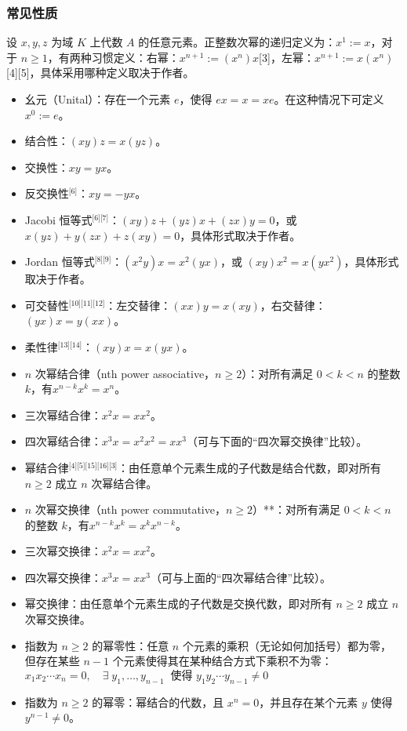\subsubsection{常见性质}
设 $x, y, z$ 为域 $K$ 上代数 $A$ 的任意元素。正整数次幂的递归定义为：$x^1 := x$，对于 $n \geq 1$，有两种习惯定义：右幂：$x^{n+1} := (x^n)x$[3]，左幂：$x^{n+1} := x(x^n)$[4][5]，具体采用哪种定义取决于作者。
\begin{itemize}
\item 幺元（Unital）：存在一个元素 $e$，使得 $ex = x = xe$。在这种情况下可定义 $x^0 := e$。
\item 结合性：$(xy)z = x(yz)$。
\item 交换性：$xy = yx$。
\item 反交换性\(^\text{[6]}\)：$xy = -yx$。
\item Jacobi 恒等式\(^\text{[6][7]}\)：$(xy)z + (yz)x + (zx)y = 0$，或 $x(yz) + y(zx) + z(xy) = 0$，具体形式取决于作者。
\item Jordan 恒等式\(^\text{[8][9]}\)：$(x^2y)x = x^2(yx)$，或 $(xy)x^2 = x(yx^2)$，具体形式取决于作者。
\item 可交替性\(^\text{[10][11][12]}\)：左交替律：$(xx)y = x(xy)$，右交替律：$(yx)x = y(xx)$。
\item 柔性律\(^\text{[13][14]}\)：$(xy)x = x(yx)$。
\item $n$ 次幂结合律（nth power associative，$n \geq 2$）：对所有满足 $0 < k < n$ 的整数 $k$，有$x^{n-k}x^k = x^n$。
\item 三次幂结合律：$x^2x = xx^2$。
\item 四次幂结合律：$x^3x = x^2x^2 = xx^3$（可与下面的“四次幂交换律”比较）。
\item 幂结合律\(^\text{[4][5][15][16][3]}\)：由任意单个元素生成的子代数是结合代数，即对所有 $n \geq 2$ 成立 $n$ 次幂结合律。
\item $n$ 次幂交换律（nth power commutative，$n \geq 2$）**：对所有满足 $0 < k < n$ 的整数 $k$，有$x^{n-k}x^k = x^kx^{n-k}$。
\item 三次幂交换律：$x^2x = xx^2$。
\item 四次幂交换律：$x^3x = xx^3$（可与上面的“四次幂结合律”比较）。
\item 幂交换律：由任意单个元素生成的子代数是交换代数，即对所有 $n \geq 2$ 成立 $n$ 次幂交换律。
\item 指数为 $n \geq 2$ 的幂零性：任意 $n$ 个元素的乘积（无论如何加括号）都为零，但存在某些 $n-1$ 个元素使得其在某种结合方式下乘积不为零：$x_1x_2\cdots x_n = 0, \quad \exists \; y_1,\dots,y_{n-1} \;\; \text{使得 } y_1y_2\cdots y_{n-1} \neq 0$
\item 指数为 $n \geq 2$ 的幂零：幂结合的代数，且 $x^n = 0$，并且存在某个元素 $y$ 使得 $y^{n-1} \neq 0$。
\end{itemize}

